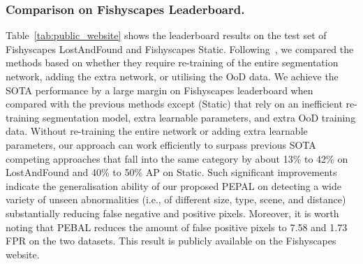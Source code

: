 \documentclass[runningheads]{llncs}
\begin{document}
\subsubsection{Comparison on Fishyscapes Leaderboard.}
Table~\ref{tab:public_website} shows the leaderboard results on the test set of Fishyscapes LostAndFound and Fishyscapes Static. Following~\cite{jung2021standardized}, we compared the methods based on whether they require re-training of the entire segmentation network, adding the extra network, or utilising the OoD data. We achieve the SOTA performance by a large margin on Fishyscapes leaderboard when compared with the previous methods except \cite{bevandic2019simultaneous} (Static) that rely on an inefficient re-training segmentation model, extra learnable parameters, and extra OoD training data. Without re-training the entire network or adding extra learnable parameters, our approach can work efficiently to surpass previous SOTA competing approaches that fall into the same category by about 13\% to 42\% on LostAndFound and 40\% to 50\% AP on Static. 
Such significant improvements indicate the generalisation ability of our proposed PEPAL on detecting a wide variety of unseen abnormalities (i.e., of different size, type, scene, and distance) substantially reducing false negative and positive pixels. 
Moreover, it is worth noting that  PEBAL reduces the amount of false positive pixels to 7.58 and 1.73 FPR on the two datasets. This result is publicly available on the Fishyscapes website. 
\end{document}
